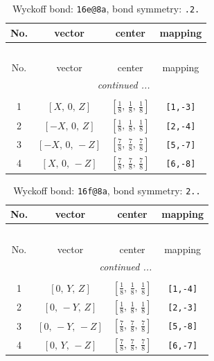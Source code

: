 \documentclass[fleqn,8pt]{jsarticle}
\begin{document}
\renewcommand{\arraystretch}{1.2}
\begin{longtable}{cccc}
\caption{Wyckoff bond: {\tt 16e@8a}, bond symmetry: {\tt .2.}}
 \\
 \hline \hline
No. & vector & center & mapping \\ \hline \endfirsthead

\multicolumn{3}{l}{\tablename\ \thetable{}} \\
 \hline \hline
No. & vector & center & mapping \\ \hline \endhead

 \hline \hline
\multicolumn{3}{r}{\footnotesize\it continued ...} \\ \endfoot

 \hline \hline
\multicolumn{3}{r}{} \\ \endlastfoot

1 & $\left[ X,\, 0,\, Z \right]$ & $\left[ \frac{1}{8},\, \frac{1}{8},\, \frac{1}{8} \right]$ & {\tt [1,-3]} \\ \hline
2 & $\left[ - X,\, 0,\, Z \right]$ & $\left[ \frac{1}{8},\, \frac{1}{8},\, \frac{1}{8} \right]$ & {\tt [2,-4]} \\ \hline
3 & $\left[ - X,\, 0,\, - Z \right]$ & $\left[ \frac{7}{8},\, \frac{7}{8},\, \frac{7}{8} \right]$ & {\tt [5,-7]} \\ \hline
4 & $\left[ X,\, 0,\, - Z \right]$ & $\left[ \frac{7}{8},\, \frac{7}{8},\, \frac{7}{8} \right]$ & {\tt [6,-8]} \\
\end{longtable}
\renewcommand{\arraystretch}{1.2}
\begin{longtable}{cccc}
\caption{Wyckoff bond: {\tt 16f@8a}, bond symmetry: {\tt 2..}}
 \\
 \hline \hline
No. & vector & center & mapping \\ \hline \endfirsthead

\multicolumn{3}{l}{\tablename\ \thetable{}} \\
 \hline \hline
No. & vector & center & mapping \\ \hline \endhead

 \hline \hline
\multicolumn{3}{r}{\footnotesize\it continued ...} \\ \endfoot

 \hline \hline
\multicolumn{3}{r}{} \\ \endlastfoot

1 & $\left[ 0,\, Y,\, Z \right]$ & $\left[ \frac{1}{8},\, \frac{1}{8},\, \frac{1}{8} \right]$ & {\tt [1,-4]} \\ \hline
2 & $\left[ 0,\, - Y,\, Z \right]$ & $\left[ \frac{1}{8},\, \frac{1}{8},\, \frac{1}{8} \right]$ & {\tt [2,-3]} \\ \hline
3 & $\left[ 0,\, - Y,\, - Z \right]$ & $\left[ \frac{7}{8},\, \frac{7}{8},\, \frac{7}{8} \right]$ & {\tt [5,-8]} \\ \hline
4 & $\left[ 0,\, Y,\, - Z \right]$ & $\left[ \frac{7}{8},\, \frac{7}{8},\, \frac{7}{8} \right]$ & {\tt [6,-7]} \\
\end{longtable}
\end{document}
